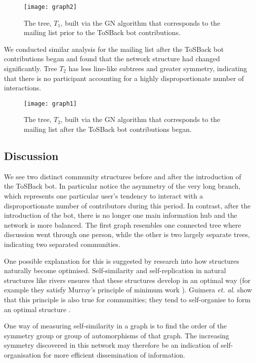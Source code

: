 \documentclass{sig-alternate}
\begin{document}
\begin{figure}[H]
\texttt{[image: graph2]}\caption{ The tree, $T_1$, built via the GN algorithm that corresponds to the mailing list prior to the ToSBack bot contributions.}\label{fig:t1}
\end{figure}

We conducted similar analysis for the mailing list after the ToSBack bot contributions began and found that the network structure had changed significantly. Tree $T_2$ has less line-like subtrees and greater symmetry, indicating that there is no participant accounting for a highly disproportionate number of interactions.

\begin{figure}[H]
\texttt{[image: graph1]}\caption[width=7]{ The tree, $T_2$, built via the GN algorithm that corresponds to the mailing list after the ToSBack bot contributions began. }\label{fig:t2}
\end{figure}


\subsection{Discussion}

We see two distinct community structures before and after the introduction of the ToSBack bot. In particular notice the asymmetry of the very long branch, which represents one particular user's tendency to interact with a disproportionate number of contributors during this period. In contrast, after the introduction of the bot, there is no longer one main information hub and the network is more balanced. The first graph resembles one connected tree where discussion went through one person, while the other is two largely separate trees, indicating two separated communities.

One possible explanation for this is suggested by research into how structures naturally become optimised. Self-similarity and self-replication in natural structures like rivers ensures that these structures develop in an optimal way (for example they satisfy Murray's principle of minimum work \cite{murray:min}). Guimera \emph{et. al.} show that this principle is also true for communities; they tend to self-organise to form an optimal structure \cite{guimera:comm}.

One way of measuring self-similarity in a graph is to find the order of the symmetry group or group of automorphisms of that graph. The increasing symmetry discovered in this network may therefore be an indication of self-organisation for more efficient dissemination of information. 
\end{document}
